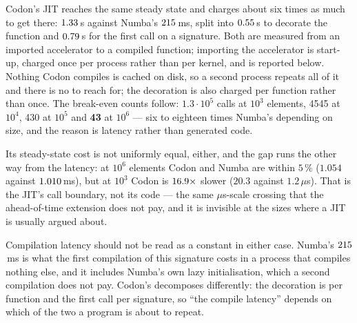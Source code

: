 Codon's JIT reaches the same steady state and charges about six times as much to get there:
$\meas{fact:b1_breakeven-314:facts.codon_cost_s.compile_s}{1.33}$\,s against Numba's $\meas{fact:b1_breakeven-314:facts.numba_compile_s:ms}{215}$\,ms, split into $\meas{fact:b1_breakeven-314:facts.codon_cost_s.decorate_s}{0.55}$\,s to decorate the function and
$\meas{fact:b1_breakeven-314:facts.codon_cost_s.first_call_s}{0.79}$\,s for the first call on a signature. Both are measured from an imported accelerator to a
compiled function; importing the accelerator is start-up, charged once per process rather than
per kernel, and is reported below. Nothing Codon compiles is cached on disk, so a second process repeats all of it and
there is no  to reach for; the decoration is also charged per function rather
than once. The break-even counts follow: \textbf{$1.3\cdot10^5$} calls at $10^3$ elements, 4545
at $10^4$, 430 at $10^5$ and \textbf{43} at $10^6$ --- six to eighteen times Numba's depending
on size, and the reason is latency rather than generated code.

Its steady-state cost is not uniformly equal, either, and the gap runs the other way from the
latency: at $10^6$ elements Codon and Numba are within $5\,\%$ ($1.054$ against $\meas{med:b1_breakeven-314:arraysum_n1000000/numba:ms}{1.010}$\,ms),
but at $10^3$ Codon is $\meas{ratio:b1_breakeven-314:arraysum_n1000/codon_jit|b1_breakeven-314:arraysum_n1000/numba}{16.9}\times$ slower ($20.3$ against $1.2\,\mu$s). That is the JIT's
call boundary, not its code --- the same $\mu$s-scale crossing that the ahead-of-time
extension does not pay, and it is invisible at the sizes where a JIT is usually argued about.

Compilation latency should not be read as a constant in either case. Numba's $\meas{fact:b1_breakeven-314:facts.numba_compile_s:ms}{215}$\,ms is what
the first  compilation of this signature costs in a process that compiles nothing
else, and it includes Numba's own lazy initialisation, which a second compilation does not
pay. Codon's decomposes differently: the decoration is per function and the first call per
signature, so ``the compile latency'' depends on which of the two a program is about to repeat.

